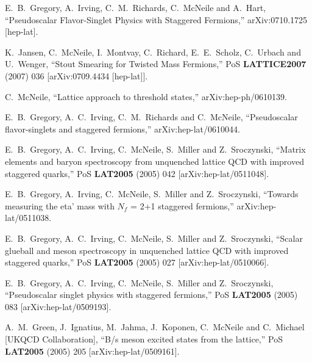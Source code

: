 \begin{thebibliography}{130}
  E.~B.~Gregory, A.~Irving, C.~M.~Richards, C.~McNeile and A.~Hart,
  ``Pseudoscalar Flavor-Singlet Physics with Staggered Fermions,''
  arXiv:0710.1725 [hep-lat].

  K.~Jansen, C.~McNeile, I.~Montvay, C.~Richard, E.~E.~Scholz, C.~Urbach and U.~Wenger,
  ``Stout Smearing for Twisted Mass Fermions,''
  PoS {\bf LATTICE2007} (2007) 036
  [arXiv:0709.4434 [hep-lat]].

  C.~McNeile,
  ``Lattice approach to threshold states,''
  arXiv:hep-ph/0610139.

  E.~B.~Gregory, A.~C.~Irving, C.~M.~Richards and C.~McNeile,
  ``Pseudoscalar flavor-singlets and staggered fermions,''
  arXiv:hep-lat/0610044.

E.~B.~Gregory, A.~C.~Irving, C.~McNeile, S.~Miller and Z.~Sroczynski,
``Matrix elements and baryon spectroscopy from unquenched lattice QCD
with improved staggered quarks,''
PoS {\bf LAT2005} (2005) 042
[arXiv:hep-lat/0511048].

E.~B.~Gregory, A.~Irving, C.~McNeile, S.~Miller and Z.~Sroczynski,
``Towards measuring the eta' mass with $N_f$ = 2+1 staggered
fermions,''
arXiv:hep-lat/0511038.

E.~B.~Gregory, A.~C.~Irving, C.~McNeile, S.~Miller and
Z.~Sroczynski,
``Scalar glueball and meson spectroscopy in unquenched lattice QCD
with
improved staggered quarks,''
PoS {\bf LAT2005} (2005) 027
[arXiv:hep-lat/0510066].

E.~B.~Gregory, A.~C.~Irving, C.~McNeile, S.~Miller and Z.~Sroczynski,
``Pseudoscalar singlet physics with staggered fermions,''
PoS {\bf LAT2005} (2005) 083
[arXiv:hep-lat/0509193].

A.~M.~Green, J.~Ignatius, M.~Jahma, J.~Koponen, C.~McNeile and
C.~Michael
                  [UKQCD Collaboration],
``B/s meson excited states from the lattice,''
PoS {\bf LAT2005} (2005) 205
[arXiv:hep-lat/0509161].



\end{thebibliography}
